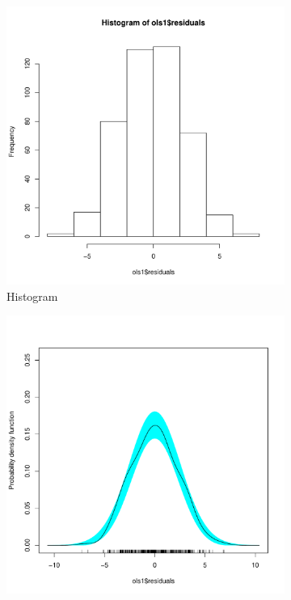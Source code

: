 \documentclass[11pt,openany]{book}\usepackage[]{graphicx}\usepackage[]{color}
\begin{document}
\begin{figure}
        \centering
        \begin{subfigure}[b]{0.4\textwidth}
                \centering
                \includegraphics[width=\textwidth]{15_Diagnostics/multresidhist.pdf} %
                \caption{Histogram \label{fig:multresidhist}}
        \end{subfigure}
        \begin{subfigure}[b]{0.4\textwidth}
                \centering
                \includegraphics[width=\textwidth]{15_Diagnostics/multresidden.pdf} %

\end{subfigure}
\end{figure}
\end{document}
